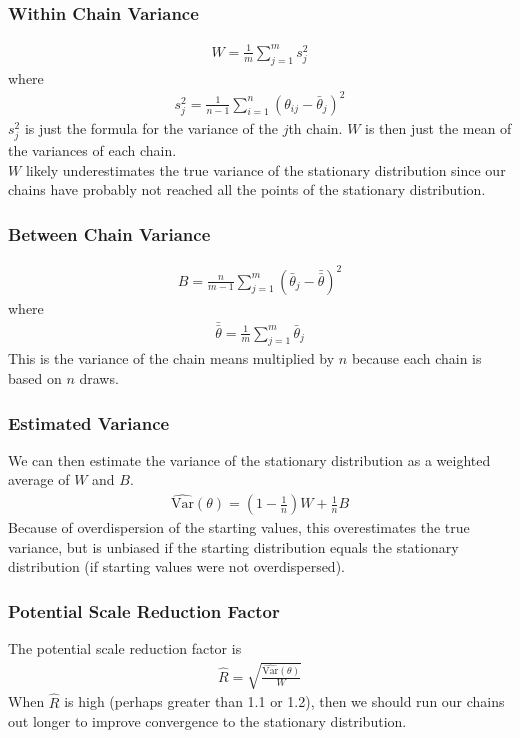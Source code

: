 \documentclass{beamer}
\begin{document}
\begin{frame}
\frametitle{Within Chain Variance}
\pause
\begin{eqnarray*}
W = \frac{1}{m} \sum_{j=1}^m s^2_j
\end{eqnarray*} 
where
\begin{eqnarray*}
s^2_j = \frac{1}{n-1} \sum_{i=1}^n (\theta_{ij} - \bar{\theta}_j)^2
\end{eqnarray*}
\pause
$s^2_j$ is just the formula for the variance of the $j$th chain.
\pause  $W$ is then just the mean of the variances of each chain.\\
\pause
\bigskip
$W$ likely underestimates the true variance of the stationary distribution
since our chains have probably not reached all the points of the
stationary distribution.
\end{frame}

\begin{frame}
\frametitle{Between Chain Variance}
\pause
\begin{eqnarray*}
B = \frac{n}{m-1} \sum_{j=1}^m (\bar{\theta}_j - \bar{\bar{\theta}})^2
\end{eqnarray*}
where
\begin{eqnarray*}
\bar{\bar{\theta}} = \frac{1}{m} \sum_{j=1}^m \bar{\theta}_j
\end{eqnarray*}
\pause
This is the variance of the chain means multiplied by $n$ because each
chain is based on $n$ draws.
\end{frame}

\begin{frame}
\frametitle{Estimated Variance}
\pause
We can then estimate the variance of the stationary distribution as a
weighted average of $W$ and $B$.
\pause
\begin{eqnarray*}
\hat{\mathrm{Var}}(\theta) = (1-\frac{1}{n}) W + \frac{1}{n} B
\end{eqnarray*}
\pause
Because of overdispersion of the starting values, this overestimates
the true variance, but is unbiased if the starting distribution equals
the stationary distribution (if starting values were not overdispersed).
\end{frame}

\begin{frame}
\frametitle{Potential Scale Reduction Factor}
\pause
The potential scale reduction factor is
\begin{eqnarray*}
\hat{R} = \sqrt{\frac{\hat{\mathrm{Var}}(\theta)}{W}}
\end{eqnarray*}
\pause
When $\hat{R}$ is high (perhaps greater than 1.1 or 1.2), then we
should run our chains out longer to improve convergence to the
stationary distribution.
\end{frame}
\end{document}
